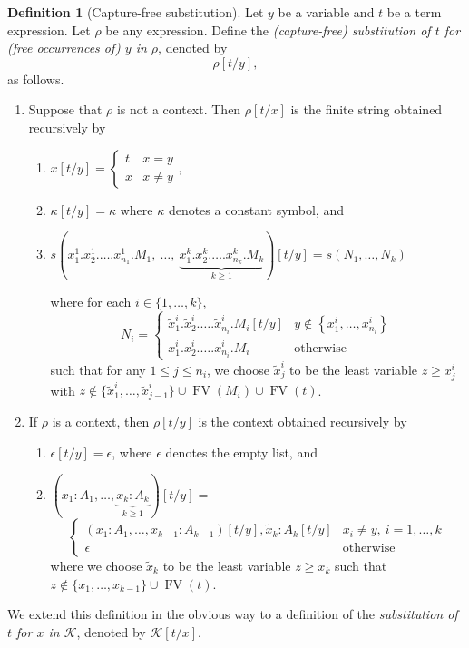 \documentclass[10pt,letterpaper,cm]{nupset}
\theoremstyle{definition}
\newtheorem{definition}{Definition}[subsection]
\theoremstyle{theorem}
\theoremstyle{remark}
\newcommand{\K}{\mathcal K}
\newcommand{\0}{\mathbf{0}}
\newcommand{\1}{\mathbf{1}}
\newcommand{\2}{\mathbf{2}}
\DeclareMathOperator{\fv}{FV}
\newcommand{\be}{\begin{enumerate}}
\newcommand{\ee}{\end{enumerate}}
\begin{document}
\begin{definition}[Capture-free substitution] Let $y$ be a variable and $t$ be a term expression. Let $\rho$ be any expression. Define the \textit{(capture-free) substitution of $t$ for (free occurrences of) $y$ in $\rho$}, denoted by $$ \rho\left[t/y\right] ,   $$ as follows.
\be
\item Suppose that $\rho$ is not a context.  Then $\rho\left[t/x\right]$ is the finite string obtained recursively by
\be
\item $x\left[t/y\right] = \begin{cases} t & x = y \\ x & x\ne y\end{cases} , $
\item $\kappa\left[t/y\right]  = \kappa$ where $\kappa$ denotes a constant symbol, and
\item 

 $s\left(x^1_1.x^1_2.\ldots.x^1_{n_1}.M_{1},\ \ldots,\  \underbrace{x^k_1.x^k_2.\ldots.x^k_{n_k}.M_{k}}_{k\geq 1}\right)\left[t/y\right]   =
  s\left(N_1, \ldots, N_k \right)$

where for each $i\in \{1, \ldots, k\}$,
\[
N_i = 
\begin{cases}
\tilde{x}^i_1.\tilde{x}^i_2.\ldots.\tilde{x}^i_{n_i}.M_{i}\left[t/y\right]  & y \notin \left\{x^i_1, \ldots, x^i_{n_i}\right\} \\ 
x^i_1.x^i_2.\ldots.x^i_{n_i}.M_{i} &  \text{otherwise}
\end{cases}
\]
such that for any $1\leq j \leq n_i$, we choose $\tilde{x}_j^i$ to be the least variable $z \geq x_j^i$ with \linebreak $z \notin \{\tilde{x}^i_1, \ldots, \tilde{x}_{j-1}^i\} \cup \fv(M_i) \cup \fv(t)$.
\ee
\item If $\rho$ is a context, then $ \rho\left[t/y\right]$ is the context obtained recursively by
\be
\item $\epsilon\left[t/y\right] = \epsilon$, where $\epsilon$ denotes the empty list, and
\item $\left(x_1 : A_1, \ldots, \underbrace{x_k :A_k}_{k\geq 1}\right)\left[t/y\right] = $
\[ \begin{cases}
(x_1 :A _1, \ldots, x_{k-1} : A_{k-1})\left[t/y\right], \tilde{x}_k :A_k\left[t/y\right] & x_i \ne y, \ i = 1, \ldots, k
\\
\epsilon & \text{otherwise}
\end{cases}
\]  where we choose $\tilde{x}_k$ to be the least variable $z \geq x_k$ such that $z\notin \{x_1, \ldots, x_{k-1}\} \cup \fv(t)$.
\ee
\ee
We extend this definition in the obvious way to a definition of the \textit{substitution of $t$ for $x$ in $\K$}, denoted by $\K\left[t/x\right]$.
\end{definition}
\end{document}
